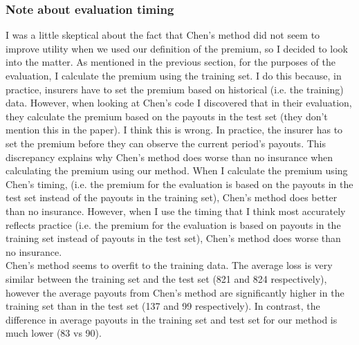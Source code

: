 \documentclass[11pt]{article}
\begin{document}
    \subsubsection{Note about evaluation timing}
      I was a little skeptical about the fact that Chen's method did not seem to improve utility when we used our definition of the premium, so I decided to look into the matter. As mentioned in the previous section, for the purposes of the evaluation, I calculate the premium using the training set. I do this because, in practice, insurers have to set the premium based on historical (i.e. the training) data. However, when looking at Chen's code I discovered that in their evaluation, they calculate the premium based on the payouts in the test set (they don't mention this in the paper). I think this is wrong. In practice, the insurer has to set the premium before they can observe the current period's payouts. This discrepancy explains why Chen's method does worse than no insurance when calculating the premium using our method. When I calculate the premium using Chen's timing, (i.e. the premium for the evaluation is based on the payouts in the test set instead of the payouts in the training set), Chen's method does better than no insurance. However, when I use the timing that I think most accurately reflects practice (i.e. the premium for the evaluation is based on payouts in the training set instead of payouts in the test set), Chen's method does worse than no insurance. \\
      Chen's method seems to overfit to the training data. The average loss is very similar between the training set and the test set (821 and 824 respectively), however the average payouts from Chen's method are significantly higher in the training set than in the test set (137 and 99 respectively). In contrast, the difference in average payouts in the training set and test set for our method is much lower (83 vs 90). 
\end{document}
